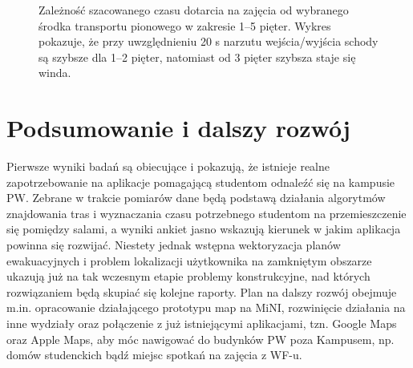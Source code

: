 \documentclass[14pt,a4paper]{extarticle}
\begin{document}
\begin{figure}[htpb]
    \centering
    \caption{Zależność szacowanego czasu dotarcia na zajęcia od wybranego środka transportu pionowego w zakresie 1--5 pięter. Wykres pokazuje, że przy uwzględnieniu 20 s narzutu wejścia/wyjścia schody są szybsze dla 1--2 pięter, natomiast od 3 pięter szybsza staje się winda.}
    \label{fig:wykres-windy}
\end{figure}

\section{Podsumowanie i dalszy rozwój}

Pierwsze wyniki badań są obiecujące i pokazują, że istnieje realne zapotrzebowanie na aplikacje pomagającą studentom odnaleźć się na kampusie PW. Zebrane w trakcie pomiarów dane będą podstawą działania algorytmów znajdowania tras i wyznaczania czasu potrzebnego studentom na przemieszczenie się pomiędzy salami, a wyniki ankiet jasno wskazują kierunek w jakim aplikacja powinna się rozwijać. Niestety jednak wstępna wektoryzacja planów ewakuacyjnych i problem lokalizacji użytkownika na zamkniętym obszarze ukazują już na tak wczesnym etapie problemy konstrukcyjne, nad których rozwiązaniem będą skupiać się kolejne raporty. Plan na dalszy rozwój obejmuje m.in. opracowanie działającego prototypu map na MiNI, rozwinięcie działania na inne wydziały oraz połączenie z już istniejącymi aplikacjami, tzn. Google Maps oraz Apple Maps, aby móc nawigować do budynków PW poza Kampusem, np. domów studenckich bądź miejsc spotkań na zajęcia z WF-u.
\end{document}
